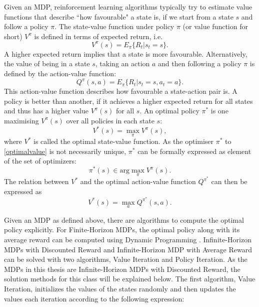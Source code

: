 \documentclass[../main.tex]{subfiles}
\begin{document}
Given an MDP, reinforcement learning algorithms typically try to estimate value functions that describe ``how favourable" a state is, if we start from a state $s$ and follow a policy $\pi$. The state-value function under policy $\pi$ (or value function for short) $V^\pi$ is defined in terms of expected return, i.e.
\begin{equation}
V^\pi(s) = E_\pi\{R_t|s_t = s\}.
\end{equation}
A higher expected return implies that a state is more favourable. Alternatively, the value of being in a state $s$, taking an action $a$ and then following a policy $\pi$ is defined by the action-value function:
\begin{equation}
Q^\pi(s,a) = E_\pi\{R_t|s_t = s, a_t = a\}.
\end{equation}
This action-value function describes how favourable a state-action pair is. A policy is better than another, if it achieves a higher expected return for all states and thus has a higher value $V^\pi(s)$ for all $s$. An optimal policy $\pi^*$ is one maximising $V^\pi(s)$ over all policies in each state $s$:
\begin{equation}\label{optimalvalue}
V^*(s) = \max_\pi V^\pi(s),
\end{equation}
where $V^*$ is called the optimal state-value function. As the optimiser $\pi^*$ to \eqref{optimalvalue} is not necessarily unique, $\pi^*$ can be formally expressed as element of the set of optimizers:
\begin{equation}
\pi^*(s) \in \text{arg}\max_\pi V^\pi(s).
\end{equation}
The relation between $V^*$ and the optimal action-value function $Q^{\pi^*}$ can then be expressed as 
\begin{equation}
    V^*(s) = \max_a Q^{\pi^*}(s,a).
\end{equation}
\par
Given an MDP as defined above, there are algorithms to compute the optimal policy explicitly. For Finite-Horizon MDPs, the optimal policy along with its average reward can be computed using Dynamic Programming \cite{bellman2013dynamic}. Infinite-Horizon MDPs with Discounted Reward and Infinite-Horizon MDP with Average Reward can be solved with two algorithms, Value Iteration and Policy Iteration. As the MDPs in this thesis are Infinite-Horizon MDPs with Discounted Reward, the solution methods for this class will be explained below.
The first algorithm, Value Iteration, initializes the values of the states randomly and then updates the values each iteration according to the following expression:
\end{document}
